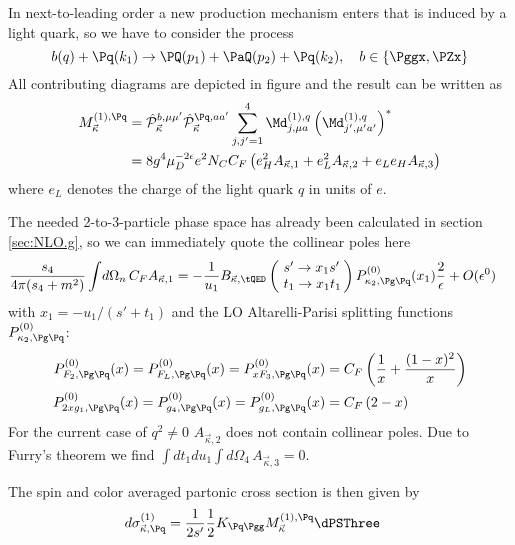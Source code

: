In next-to-leading order a new production mechanism enters that is induced by a light quark, so we have to consider the process
\begin{equation}
b(q) + \Pq(k_1) \rightarrow \PQ(p_1)+\PaQ(p_2) + \Pq(k_2),\quad b\in\{\Pggx,\PZx\}
\end{equation}
All contributing diagrams are depicted in figure  and the result can be written as
\begin{align}
M_{\vec \kappa}^{(1),\Pq} &= \hat {\mathcal P}_{\vec \kappa}^{b,\mu\mu'}\hat {\mathcal P}_{\vec \kappa}^{\Pq,aa'}\sum_{j,j'=1}^4\Md^{(1),q}_{j,\mu a}\left(\Md^{(1),q}_{j',\mu' a'}\right)^*\\
 &= 8g^4\mu_D^{-2\epsilon}e^2 N_C C_F\left( e_H^2 A_{\vec \kappa,1} +  e_L^2 A_{\vec \kappa,2} +  e_L e_H A_{\vec \kappa,3} \right)
\end{align}
where $e_L$ denotes the charge of the light quark $q$ in units of $e$.

The needed 2-to-3-particle phase space has already been calculated in section \ref{sec:NLO.g}, so we can immediately quote the collinear poles here
\begin{align}
\frac{s_4}{4\pi(s_4+m^2)}\int\!d\Omega_n \,C_F A_{\vec \kappa,1} &=-\frac 1 {u_1}B_{\vec \kappa,\tQED}\left(\!\begin{array}{l}s'\rightarrow x_1s'\\t_1\rightarrow x_1 t_1\end{array}\!\!\right) P^{(0)}_{\kappa_2,\Pg\Pq}(x_1)\frac 2 \epsilon + O(\epsilon^0)
\end{align}
with $x_1 = -u_1/(s'+t_1)$ and the LO Altarelli-Parisi splitting functions $P^{(0)}_{\kappa_2,\Pg\Pq}$\cite{Altarelli:1977zs,Vogelsang:1995vh}:
\begin{align}
P^{(0)}_{F_2,\Pg\Pq}(x) = P^{(0)}_{F_L,\Pg\Pq}(x) = P^{(0)}_{xF_3,\Pg\Pq}(x) &= C_F\left(\frac 1 x + \frac {(1-x)^2} x\right) \label{eq:PGLgq} \\
P^{(0)}_{2xg_1,\Pg\Pq}(x) = P^{(0)}_{g_4,\Pg\Pq}(x) = P^{(0)}_{g_L,\Pg\Pq}(x) &= C_F\left(2-x\right) \label{eq:PPgq}
\end{align}
For the current case of $q^2\neq 0$ $A_{\vec \kappa,2}$ does not contain collinear poles. Due to Furry's theorem we find $\int\!dt_1du_1\int\!d\Omega_4 \,A_{\vec \kappa,3}=0$.

The spin and color averaged partonic cross section is then given by
\begin{align}
d\sigma_{\vec \kappa,\Pq}^{(1)} &= \frac 1 {2s'}\frac 1 2 K_{\Pq\Pgg} M_{\vec \kappa}^{(1),\Pq} \dPSThree
\end{align}
